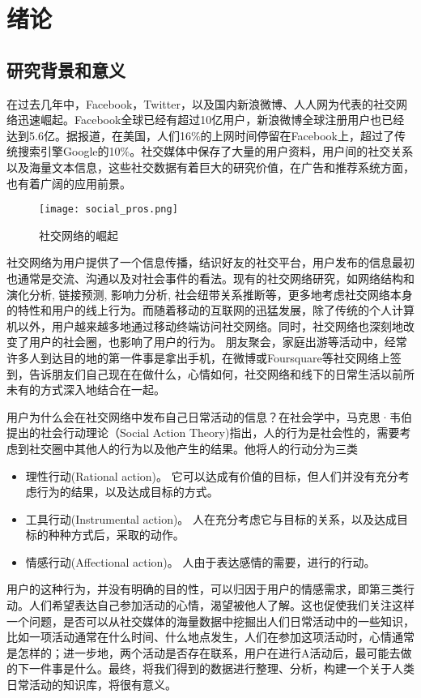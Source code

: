 \chapter{绪论}
\section{研究背景和意义}
在过去几年中，Facebook，Twitter，以及国内新浪微博、人人网为代表的社交网络迅速崛起。Facebook全球已经有超过10亿用户，新浪微博全球注册用户也已经达到5.6亿。据报道，在美国，人们16\%的上网时间停留在Facebook上，超过了传统搜索引擎Google的10\%。社交媒体中保存了大量的用户资料，用户间的社交关系以及海量文本信息，这些社交数据有着巨大的研究价值，在广告和推荐系统方面，也有着广阔的应用前景。

\begin{figure}[!h]
\centering
\texttt{[image: social\_pros.png]}
\caption{社交网络的崛起}
\end{figure}

社交网络为用户提供了一个信息传播，结识好友的社交平台，用户发布的信息最初也通常是交流、沟通以及对社会事件的看法。现有的社交网络研究，如网络结构和演化分析\cite{leskovec2008microscopic}, 链接预测\cite{liben2007link}, 影响力分析\cite{tang2009social}, 社会纽带关系推断\cite{tang2011learning}等，更多地考虑社交网络本身的特性和用户的线上行为。而随着移动的互联网的迅猛发展，除了传统的个人计算机以外，用户越来越多地通过移动终端访问社交网络。同时，社交网络也深刻地改变了用户的社会圈，也影响了用户的行为。 朋友聚会，家庭出游等活动中，经常许多人到达目的地的第一件事是拿出手机，在微博或Foursquare等社交网络上签到，告诉朋友们自己现在在做什么，心情如何，社交网络和线下的日常生活以前所未有的方式深入地结合在一起。

用户为什么会在社交网络中发布自己日常活动的信息？在社会学中，马克思·韦伯提出的社会行动理论（Social Action Theory)\cite{webber1991social}指出，人的行为是社会性的，需要考虑到社交圈中其他人的行为以及他产生的结果。他将人的行动分为三类
\begin{itemize}
\item 理性行动(Rational action)。 它可以达成有价值的目标，但人们并没有充分考虑行为的结果，以及达成目标的方式。
\item 工具行动(Instrumental action)。 人在充分考虑它与目标的关系，以及达成目标的种种方式后，采取的动作。
\item 情感行动(Affectional action)。 人由于表达感情的需要，进行的行动。
\end{itemize}
用户的这种行为，并没有明确的目的性，可以归因于用户的情感需求，即第三类行动。人们希望表达自己参加活动的心情，渴望被他人了解。这也促使我们关注这样一个问题，是否可以从社交媒体的海量数据中挖掘出人们日常活动中的一些知识，比如一项活动通常在什么时间、什么地点发生，人们在参加这项活动时，心情通常是怎样的；进一步地，两个活动是否存在联系，用户在进行A活动后，最可能去做的下一件事是什么。最终，将我们得到的数据进行整理、分析，构建一个关于人类日常活动的知识库，将很有意义。

